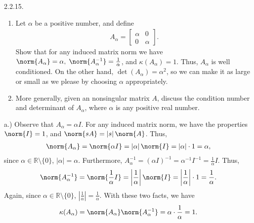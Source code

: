 \documentclass{report}
\begin{document}
    \bigbreak \noindent 
    \begin{mdframed}
        2.2.15. 
        \begin{enumerate}[label=(\alph*)]
            \item Let $\alpha$ be a positive number, and define
                \begin{align*}
                    A_{\alpha} = \begin{bmatrix} \alpha & 0 \\ 0 & \alpha \end{bmatrix}
                .\end{align*}
                Show that for any induced matrix norm we have $\norm{A_{\alpha}} = \alpha,\; \norm{A_{\alpha}^{-1}} = \frac{1}{\alpha}$, and $\kappa(A_{\alpha}) =1$. Thus, $A_{\alpha} $ is well conditioned. On the other hand, $\det(A_{\alpha}) = \alpha^{2}$, so we can make it as large or small as we please by choosing $\alpha$ appropriately.
            \item More generally, given an nonsingular matrix $A$, discuss the condition number and determinant of $A_{\alpha}$, where $\alpha$ is any positive real number.
        \end{enumerate}
    \end{mdframed}
    \bigbreak \noindent 
    a.) Observe that $A_{\alpha} = \alpha I$. For any induced matrix norm, we have the properties $\norm{I} = 1$, and $\norm{s A} = \left\lvert s \right\rvert \norm{A}$. Thus,
    \begin{align*}
        \norm{A_{\alpha}} = \norm{\alpha I} = \left\lvert \alpha \right\rvert \norm{I} = \left\lvert \alpha \right\rvert \cdot 1 = \alpha,
    \end{align*}
    since $\alpha \in \mathbb{R} \setminus \{0\}$, $\left\lvert \alpha \right\rvert  = \alpha$. Furthermore, $A_{\alpha}^{-1} = \left(\alpha I\right)^{-1} = \alpha^{-1} I^{-1} = \frac{1}{\alpha}I$. Thus,
    \begin{align*}
        \norm{A_{\alpha}^{-1}} = \norm{\frac{1}{\alpha}I} = \left\lvert \frac{1}{\alpha} \right\rvert \norm{I} = \left\lvert \frac{1}{\alpha} \right\rvert \cdot 1 = \frac{1}{\alpha}
    .\end{align*}
    Again, since $\alpha \in \mathbb{R} \setminus \{0\}$, $\left\lvert \frac{1}{\alpha} \right\rvert = \frac{1}{\alpha}$. With these two facts, we have
    \begin{align*}
        \kappa(A_{\alpha}) = \norm{A_{\alpha}}\norm{A_{\alpha}^{-1}} = \alpha \cdot  \frac{1}{\alpha} =1
    .\end{align*}
\end{document}
